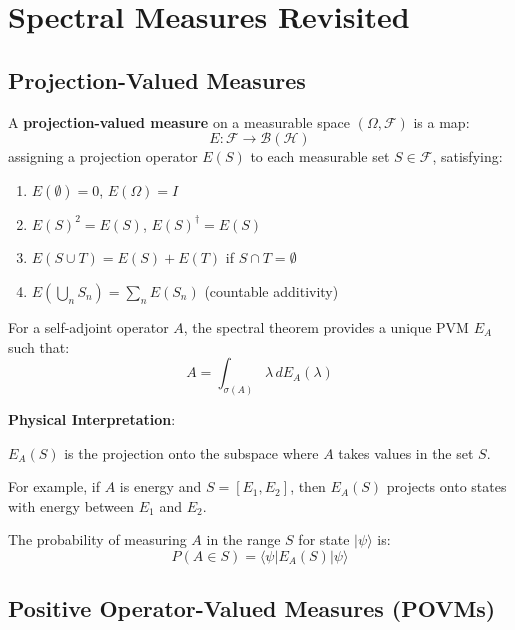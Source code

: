 \section{Spectral Measures Revisited}

\subsection{Projection-Valued Measures}

\begin{definition}\label{def:pvm}
A \textbf{projection-valued measure} on a measurable space $(\Omega, \mathcal{F})$ is a map:
\begin{equation}
E: \mathcal{F} \to \mathcal{B}(\mathcal{H})
\end{equation}
assigning a projection operator $E(S)$ to each measurable set $S \in \mathcal{F}$, satisfying:
\begin{enumerate}
\item $E(\emptyset) = 0$, $E(\Omega) = I$
\item $E(S)^2 = E(S)$, $E(S)^\dagger = E(S)$
\item $E(S \cup T) = E(S) + E(T)$ if $S \cap T = \emptyset$
\item $E(\bigcup_n S_n) = \sum_n E(S_n)$ (countable additivity)
\end{enumerate}
\end{definition}

For a self-adjoint operator $A$, the spectral theorem provides a unique PVM $E_A$ such that:
\begin{equation}
A = \int_{\sigma(A)} \lambda \, dE_A(\lambda)
\end{equation}

\begin{level1}
\textbf{Physical Interpretation}:

$E_A(S)$ is the projection onto the subspace where $A$ takes values in the set $S$.

For example, if $A$ is energy and $S = [E_1, E_2]$, then $E_A(S)$ projects onto states with energy between $E_1$ and $E_2$.

The probability of measuring $A$ in the range $S$ for state $|\psi\rangle$ is:
\begin{equation}
P(A \in S) = \langle \psi | E_A(S) | \psi \rangle
\end{equation}
\end{level1}

\subsection{Positive Operator-Valued Measures (POVMs)}

